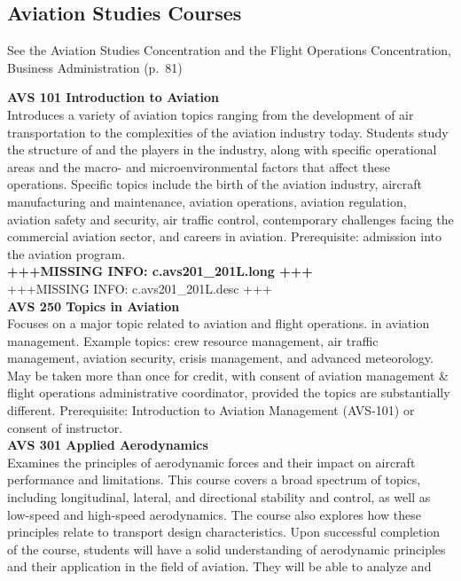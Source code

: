 \documentclass[
  letterpaper,
]{scrbook}
\begin{document}
\subsection{Aviation Studies Courses}\label{aviation-studies-courses}

See the Aviation Studies Concentration and the Flight Operations
Concentration, Business Administration (p.~81)

\textbf{AVS 101 Introduction to Aviation}\\
Introduces a variety of aviation topics ranging from the development of
air transportation to the complexities of the aviation industry today.
Students study the structure of and the players in the industry, along
with specific operational areas and the macro- and microenvironmental
factors that affect these operations. Specific topics include the birth
of the aviation industry, aircraft manufacturing and maintenance,
aviation operations, aviation regulation, aviation safety and security,
air traffic control, contemporary challenges facing the commercial
aviation sector, and careers in aviation. Prerequisite: admission into
the aviation program.\\
\textbf{+++MISSING INFO: c.avs201\_201L.long +++}\\
+++MISSING INFO: c.avs201\_201L.desc +++\\
\textbf{AVS 250 Topics in Aviation}\\
Focuses on a major topic related to aviation and flight operations. in
aviation management. Example topics: crew resource management, air
traffic management, aviation security, crisis management, and advanced
meteorology. May be taken more than once for credit, with consent of
aviation management \& flight operations administrative coordinator,
provided the topics are substantially different. Prerequisite:
Introduction to Aviation Management (AVS-101) or consent of
instructor.\\
\textbf{AVS 301 Applied Aerodynamics}\\
Examines the principles of aerodynamic forces and their impact on
aircraft performance and limitations. This course covers a broad
spectrum of topics, including longitudinal, lateral, and directional
stability and control, as well as low-speed and high-speed aerodynamics.
The course also explores how these principles relate to transport design
characteristics. Upon successful completion of the course, students will
have a solid understanding of aerodynamic principles and their
application in the field of aviation. They will be able to analyze and
\end{document}
